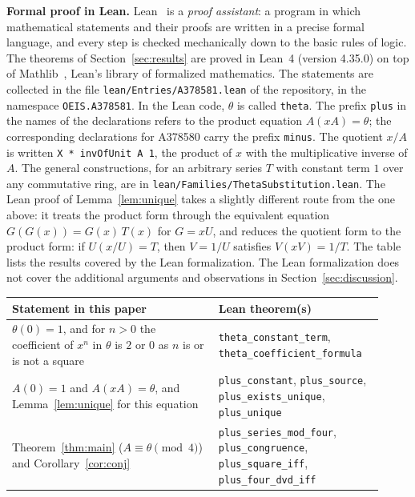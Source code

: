 \documentclass[11pt,a4paper]{article}
\theoremstyle{definition}
\theoremstyle{remark}
\newcommand{\para}[1]{\par\medskip\noindent\textbf{#1}\enspace}
\begin{document}
\para{Formal proof in Lean.}
Lean~\cite{lean} is a \emph{proof assistant}: a program in which mathematical statements and their proofs are written
in a precise formal language, and every step is checked mechanically down to the basic rules of logic. The theorems of Section~\ref{sec:results} are proved in Lean~4 (version 4.35.0) on top of
Mathlib~\cite{mathlib}, Lean's library of formalized mathematics. The statements are collected in the file \texttt{lean/Entries/A378581.lean} of the repository,
in the namespace \texttt{OEIS.A378581}. In the Lean code, $\theta$ is called \texttt{theta}. The prefix \texttt{plus} in the
names of the declarations refers to the product equation $A(xA)=\theta$; the corresponding declarations for A378580 carry the prefix
\texttt{minus}. The quotient $x/A$ is written \texttt{X * invOfUnit A 1}, the
product of $x$ with the multiplicative inverse of $A$. The general constructions, for an arbitrary series $T$ with constant term $1$
over any commutative ring, are in \texttt{lean/Families/ThetaSubstitution.lean}. The Lean proof of Lemma~\ref{lem:unique}
takes a slightly different route from the one above: it treats the product form through the equivalent equation
$G(G(x))=G(x)\,T(x)$ for $G=xU$, and reduces the quotient form to the product form: if $U(x/U)=T$, then $V=1/U$ satisfies $V(xV)=1/T$.
The table lists the results covered by the Lean formalization. The Lean formalization does not cover the additional arguments and observations in Section~\ref{sec:discussion}.
\begin{center}\small\renewcommand{\arraystretch}{1.25}
\begin{tabular}{>{\raggedright\arraybackslash}p{0.52\linewidth}>{\raggedright\arraybackslash}p{0.4\linewidth}}
\toprule
Statement in this paper & Lean theorem(s)\\
\midrule
$\theta(0)=1$, and for $n>0$ the coefficient of $x^n$ in $\theta$ is $2$ or $0$ as $n$ is or is not a square & \texttt{theta\_\allowbreak{}constant\_\allowbreak{}term}, \texttt{theta\_\allowbreak{}coefficient\_\allowbreak{}formula} \\
$A(0)=1$ and $A(xA)=\theta$, and Lemma~\ref{lem:unique} for this equation & \texttt{plus\_\allowbreak{}constant}, \texttt{plus\_\allowbreak{}source}, \texttt{plus\_\allowbreak{}exists\_\allowbreak{}unique}, \texttt{plus\_\allowbreak{}unique} \\
Theorem~\ref{thm:main} ($A\equiv\theta\pmod 4$) and Corollary~\ref{cor:conj} & \texttt{plus\_\allowbreak{}series\_\allowbreak{}mod\_\allowbreak{}four}, \texttt{plus\_\allowbreak{}congruence}, \texttt{plus\_\allowbreak{}square\_\allowbreak{}iff}, \texttt{plus\_\allowbreak{}four\_\allowbreak{}dvd\_\allowbreak{}iff} \\
\bottomrule
\end{tabular}
\end{center}
\end{document}
